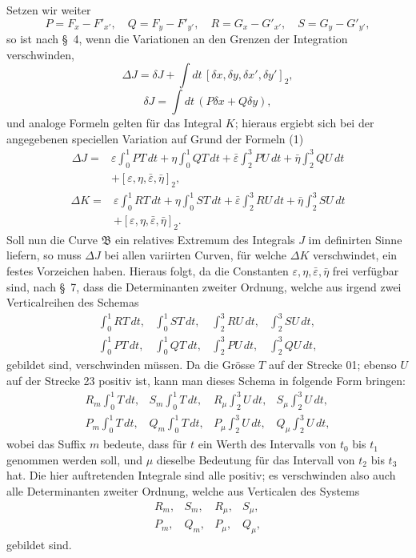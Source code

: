 \documentclass[11pt,a4paper,leqno]{article}
\begin{document}
Setzen wir weiter
\[
P=F_x-F'_{x'},\quad Q=F_y-F'_{y'},\quad
R=G_x-G'_{x'},\quad S=G_y-G'_{y'},
\]
so ist nach \S~4, wenn die Variationen an den Grenzen der Integration verschwinden,
\[
\Delta J=\delta J+\int dt\,[\delta x,\delta y,\delta x',\delta y']_2,
\]
\[
\delta J=\int dt\,(P\delta x+Q\delta y),
\]
und analoge Formeln gelten für das Integral $K$; hieraus ergiebt sich bei der angegebenen speciellen Variation auf Grund der Formeln (1)
\[
\begin{aligned}
\Delta J={}&\varepsilon\int_0^1PT\,dt+
\eta\int_0^1QT\,dt+
\bar\varepsilon\int_2^3PU\,dt+
\bar\eta\int_2^3QU\,dt\\
&+[\varepsilon,\eta,\bar\varepsilon,\bar\eta]_2,
\end{aligned}
\]
\[
\begin{aligned}
\Delta K={}&\varepsilon\int_0^1RT\,dt+
\eta\int_0^1ST\,dt+
\bar\varepsilon\int_2^3RU\,dt+
\bar\eta\int_2^3SU\,dt\\
&+[\varepsilon,\eta,\bar\varepsilon,\bar\eta]_2.
\end{aligned}
\]
Soll nun die Curve $\mathfrak{B}$ ein relatives Extremum des Integrals $J$ im definirten Sinne liefern, so muss $\Delta J$ bei allen variirten Curven, für welche $\Delta K$ verschwindet, ein festes Vorzeichen haben. Hieraus folgt, da die Constanten $\varepsilon,\eta,\bar\varepsilon,\bar\eta$ frei verfügbar sind, nach \S~7, dass die Determinanten zweiter Ordnung, welche aus irgend zwei Verticalreihen des Schemas
\[
\begin{array}{cccc}
\displaystyle \int_0^1RT\,dt,&\displaystyle \int_0^1ST\,dt,&\displaystyle \int_2^3RU\,dt,&\displaystyle \int_2^3SU\,dt,\\[2.2ex]
\displaystyle \int_0^1PT\,dt,&\displaystyle \int_0^1QT\,dt,&\displaystyle \int_2^3PU\,dt,&\displaystyle \int_2^3QU\,dt,
\end{array}
\]
gebildet sind, verschwinden müssen. Da die Grösse $T$ auf der Strecke 01; ebenso $U$ auf der Strecke 23 positiv ist, kann man dieses Schema in folgende Form bringen:
\[
\begin{array}{cccc}
\displaystyle R_m\int_0^1T\,dt,&\displaystyle S_m\int_0^1T\,dt,&\displaystyle R_\mu\int_2^3U\,dt,&\displaystyle S_\mu\int_2^3U\,dt,\\[2.2ex]
\displaystyle P_m\int_0^1T\,dt,&\displaystyle Q_m\int_0^1T\,dt,&\displaystyle P_\mu\int_2^3U\,dt,&\displaystyle Q_\mu\int_2^3U\,dt,
\end{array}
\]
wobei das Suffix $m$ bedeute, dass für $t$ ein Werth des Intervalls von $t_0$ bis $t_1$ genommen werden soll, und $\mu$ dieselbe Bedeutung für das Intervall von $t_2$ bis $t_3$ hat. Die hier auftretenden Integrale sind alle positiv; es verschwinden also auch alle Determinanten zweiter Ordnung, welche aus Verticalen des Systems
\begin{equation}\tag{2}
\begin{array}{cccc}
R_m,&S_m,&R_\mu,&S_\mu,\\
P_m,&Q_m,&P_\mu,&Q_\mu,
\end{array}
\end{equation}
gebildet sind.
\end{document}
